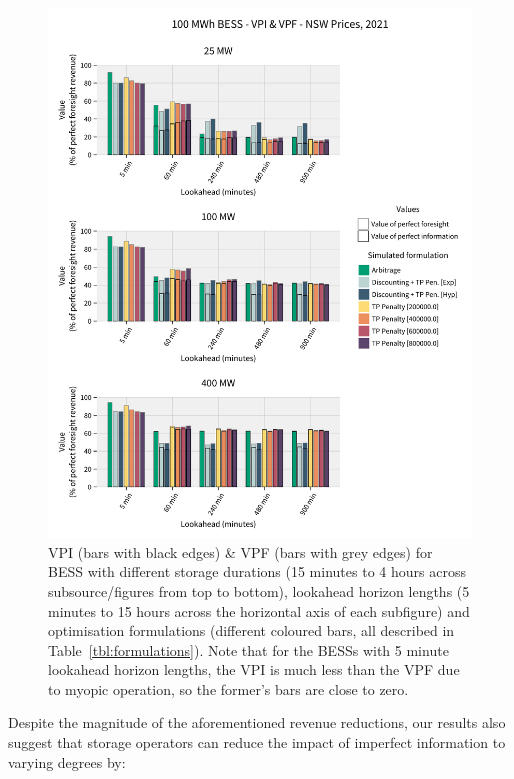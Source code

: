 \documentclass[12pt,a4paper,]{report}
\begin{document}
\begin{figure}
\hypertarget{fig:vpi_vpf}{%
\centering
\includegraphics{source/figures/NSW_100_allformulations_vpi_vpf.pdf}
\caption{VPI (bars with black edges) \& VPF (bars with grey edges) for
BESS with different storage durations (15 minutes to 4 hours across
subsource/figures from top to bottom), lookahead horizon lengths (5
minutes to 15 hours across the horizontal axis of each subfigure) and
optimisation formulations (different coloured bars, all described in
Table~\ref{tbl:formulations}). Note that for the BESSs with 5 minute
lookahead horizon lengths, the VPI is much less than the VPF due to
myopic operation, so the former's bars are close to
zero.}\label{fig:vpi_vpf}
}
\end{figure}

Despite the magnitude of the aforementioned revenue reductions, our
results also suggest that storage operators can reduce the impact of
imperfect information to varying degrees by:
\end{document}
